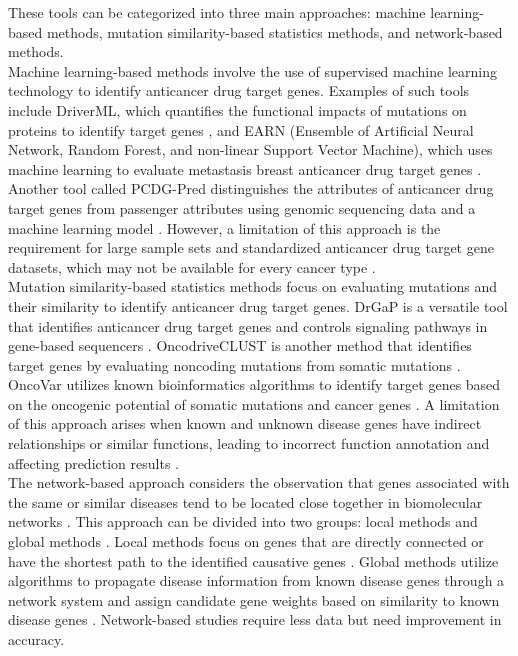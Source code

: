 \documentclass[5p,,preprint,12pt]{elsarticle}
\begin{document}
These tools can be categorized into three main approaches: machine learning-based methods, mutation similarity-based statistics methods, and network-based methods.\\
Machine learning-based methods involve the use of supervised machine learning technology to identify anticancer drug target genes. Examples of such tools include DriverML, which quantifies the functional impacts of mutations on proteins to identify target genes \cite{6}, and EARN (Ensemble of Artificial Neural Network, Random Forest, and non-linear Support Vector Machine), which uses machine learning to evaluate metastasis breast anticancer drug target genes \cite{7}. Another tool called PCDG-Pred distinguishes the attributes of anticancer drug target genes from passenger attributes using genomic sequencing data and a machine learning model \cite{8}. However, a limitation of this approach is the requirement for large sample sets and standardized anticancer drug target gene datasets, which may not be available for every cancer type \cite{9}. \\
Mutation similarity-based statistics methods focus on evaluating mutations and their similarity to identify anticancer drug target genes. DrGaP is a versatile tool that identifies anticancer drug target genes and controls signaling pathways in gene-based sequencers \cite{10}. OncodriveCLUST is another method that identifies target genes by evaluating noncoding mutations from somatic mutations \cite{11}. OncoVar utilizes known bioinformatics algorithms to identify target genes based on the oncogenic potential of somatic mutations and cancer genes \cite{12}. A limitation of this approach arises when known and unknown disease genes have indirect relationships or similar functions, leading to incorrect function annotation and affecting prediction results \cite{13,14}. \\
The network-based approach considers the observation that genes associated with the same or similar diseases tend to be located close together in biomolecular networks \cite{15}. This approach can be divided into two groups: local methods and global methods \cite{16}. Local methods focus on genes that are directly connected or have the shortest path to the identified causative genes \cite{17,18,19,20,21,22,23,24,25}. Global methods utilize algorithms to propagate disease information from known disease genes through a network system and assign candidate gene weights based on similarity to known disease genes \cite{26,27,28}. Network-based studies require less data but need improvement in accuracy. \\
\end{document}
